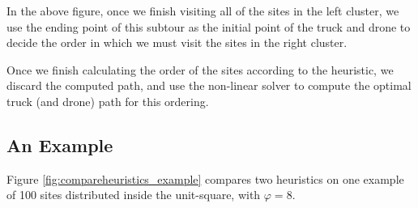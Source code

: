 \documentclass[conference]{IEEEtran}
\begin{document}
In the above figure, once we finish visiting all of the sites in the
left cluster, we use the ending point of this subtour as the initial
point of the truck and drone to decide the order in which we must
visit the sites in the right cluster.

Once we finish calculating the order of the sites according to the
heuristic, we discard the computed path, and use the non-linear solver
to compute the optimal truck (and drone) path for this ordering.

\subsection{An Example}

Figure \ref{fig:compareheuristics_example} compares two heuristics on one example of 100 sites distributed inside the unit-square, with $\varphi=8$. 
\end{document}
